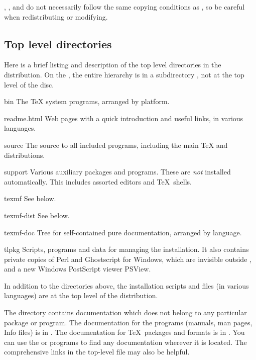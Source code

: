 \documentclass{article}
\begin{document}
\CTAN{}, , and  do not
necessarily follow the same copying conditions as \TL{}, so be careful
when redistributing or modifying.


\subsection{Top level \TL{} directories}
\label{sec:tld}

Here is a brief listing and description of the top level directories in
the \TL{} distribution.  On the  \DVD, the entire \TL{}
hierarchy is in a subdirectory , not at the top
level of the disc.

\begin{ttdescription}
\item[bin] The \TeX{} system programs, arranged by platform.
%
\item[readme.html] Web pages with a quick introduction and useful links,
in various languages.
%
\item[source] The source to all included programs, including the main \Webc{}
  \TeX{} and \MF{} distributions.
%
\item[support] Various auxiliary packages and programs.  These are
  \emph{not} installed automatically.  This includes
  assorted editors and \TeX\ shells.
%
\item[texmf] See  below.
%
\item[texmf-dist] See  below.
%
\item[texmf-doc] Tree for self-contained pure documentation, arranged by
  language.
%
\item[tlpkg] Scripts, programs and data for managing the
  installation. It also contains private copies of
  Perl and Ghostscript for Windows, which are invisible outside \TL,
  and a new Windows PostScript viewer PSView.
\end{ttdescription}

In addition to the directories above, the installation scripts and
 files (in various languages) are at the top level of
the distribution.

The  directory contains documentation which does
not belong to any particular package or program.  The documentation
for the programs (manuals, man pages, Info files) is in
.  The documentation for \TeX\ packages and
formats is in .  You can use the
 or  programs to find any
documentation wherever it is located.  The comprehensive links in
the top-level file  may also be helpful.
\end{document}
